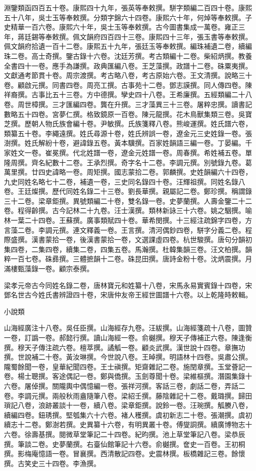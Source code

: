 \begin{pinyinscope}
淵鑒類函四百五十卷。康熙四十九年，張英等奉敕撰。駢字類編二百四十卷。康熙五十八年，吳士玉等奉敕撰。分類字錦六十四卷。康熙六十年，何焯等奉敕撰。子史精華一百六卷。康熙六十年，吳士玉等奉敕撰。古今圖書集成一萬卷。雍正三年，蔣廷錫等奉敕撰。佩文韻府四百四十三卷。康熙四十三年，張玉書等奉敕撰。佩文韻府拾遺一百十二卷。康熙五十九年，張廷玉等奉敕撰。編珠補遺二卷，續編珠二卷。高士奇撰。鑒古錄十六卷。沈廷芳撰。考古類編十二卷。柴紹炳撰。教養全書四十一卷。應手為謙撰。政典匯編八卷。王芝藻撰。政譜十二卷。硃粟夷撰。文獻通考節貫十卷。周宗渡撰。考古略八卷，考古原始六卷。王文清撰。說略三十卷。顧啟元撰。同書四卷。周亮工撰。古事苑十二卷。鄧志謨撰。同人傳四卷。陳祥裔撰。古事比五十三卷。方中德撰。孿史四十八卷。王希廉撰。五經類編二十八卷。周世樟撰。三才匯編四卷。龔在升撰。三才藻異三十三卷。屠粹忠撰。讀書記數略五十四卷。宮夢仁撰。格致鏡原一百卷。陳元龍撰。花木鳥獸集類三卷。吳寶芝撰。歷朝人物氏族會編十卷。尹敏撰。氏族箋釋八卷。熊峻運撰。姓氏譜六卷，類纂五十卷。李繩遠撰。姓氏尋源十卷，姓氏辨誤一卷，遼金元三史姓錄一卷。張澍撰。姓氏解紛十卷，避諱錄五卷。黃本驥撰。百家姓韻語三編一卷。丁晏編。千家姓文一卷。崔冕撰。代北姓譜一卷，遼金元姓譜一卷。周春撰。希姓補五卷。單隆周撰。齊名紀數十二卷。王承烈撰。奇字名十二卷。李調元撰。別號錄九卷。葛萬里撰。廿四史諱略一卷。周矩撰。國志蒙拾二卷。郭麟撰。史姓韻編六十四卷，九史同姓名略七十二卷，補遺一卷，三史同名錄四十卷。汪輝祖撰。同姓名錄八卷。王廷燦撰。歷代同姓名錄二十三卷。劉長華撰。親屬記二卷。鄭珍撰。稱謂錄三十二卷。梁章鉅撰。異號類編二十卷，雙名錄一卷。史夢蘭撰。人壽金鑒二十二卷。程得齡撰。古今記林二十九卷。汪士漢撰。類林新詠三十六卷。姚之駰撰。喻林一葉二十四卷。王蘇撰。廣事類賦四十卷。華希閔撰。十三經注疏錦字四卷，方言藻二卷。李調元撰。連文釋義一卷。王言撰。清河偶鈔四卷，駢字分義二卷。程際盛撰。漢書蒙拾一卷，後漢書蒙拾一卷，文選課虛四卷。杭世駿撰。唐句分韻初集四卷，二集四卷，續集二卷，四集五卷。馬瀚撰。杜韓集韻三卷。汪文柏撰。韻粹一百七卷。硃彞撰。三體摭韻十二卷。硃昆田撰。唐詩金粉十卷。沈炳震撰。月滿樓甄藻錄一卷。顧宗泰撰。

梁孝元帝古今同姓名錄二卷，唐林寶元和姓纂十八卷，宋馬永易實賓錄十四卷，宋鄧名世古今姓氏書辨證四十卷，宋唐仲友帝王經世圖譜十六卷。以上乾隆時敕輯。

小說類

山海經廣注十八卷。吳任臣撰。山海經存九卷。汪紱撰。山海經箋疏十八卷，圖贊一卷，訂譌一卷。郝懿行撰。讀山海經一卷。俞樾撰。穆天子傳補正六卷。陳逢衡撰。穆天子傳注疏六卷。檀萃撰。譎觚一卷。顧炎武撰。漢世說十四卷。章撫功撰。世說補二十卷。黃汝琳撰。今世說八卷。王晫撰。明語林十四卷。吳肅公撰。隴蜀餘聞一卷，皇華紀聞四卷。王士禛撰。矩齋雜記二卷。施閏章撰。玉堂薈記一卷。楊士聰撰。客途偶記一卷。鄭與僑撰。玉劍尊聞十卷。梁維樞撰。潛園集錄十六卷。屠倬撰。關隴輿中偶憶編一卷。張祥河撰。客話三卷，劇話二卷，弄話二卷。李調元撰。兩般秋雨盦隨筆八卷。梁紹壬撰。藤陰雜記十二卷。戴璐撰。歸田瑣記八卷，浪跡叢談十一卷，續八卷。梁章鉅撰。說鈴一卷。汪琬撰。觚賸八卷，續編四卷。鈕琇撰。堅瓠集六十六卷。褚人穫撰。虞初新志二十卷。張潮撰。虞初續志十二卷。鄭澍若撰。史異纂十六卷，有明異叢十卷。傅燮詷撰。續廣博物志十六卷。徐壽基撰。閱微草堂筆記二十四卷。紀昀撰。池上草堂筆記八卷。梁恭辰撰。筆談二卷。史夢蘭撰。右臺仙館筆記十六卷。俞樾撰。奩史一百卷。王初桐撰。影梅庵憶語一卷。冒襄撰。西清散記四卷。史震林撰。板橋雜記三卷。餘懷撰。古笑史三十四卷。李漁撰。


\end{pinyinscope}

